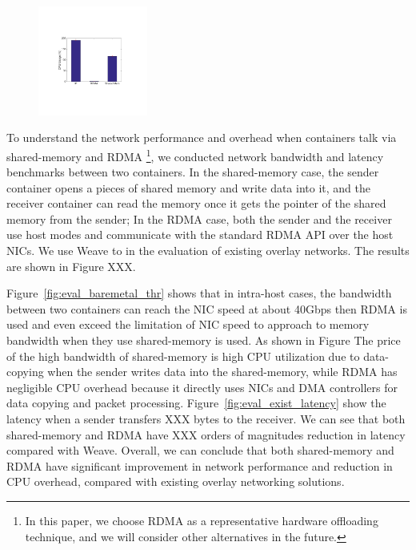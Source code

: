      \begin{figure}[ht]
     \centering 
     \includegraphics[width=0.32\textwidth]{figures/motivation/eval_baremetal_cpu.pdf}      
     \label{fig:eval_baremetal_cpu}
     \caption{} 
     \end{figure}

To understand the network performance and overhead when containers
talk via shared-memory and RDMA \footnote{In this paper, we choose RDMA
as a representative hardware offloading technique, and we will consider other
alternatives in the future.}, we conducted network bandwidth and latency benchmarks between two containers. In the shared-memory case, the sender
container opens a pieces of shared memory and write data into it, and 
the receiver container can read the memory once it gets the pointer of 
the shared memory from the sender; In the RDMA case, both the sender
and the receiver use host modes and communicate with the standard RDMA API
over the host NICs. We use Weave to in the evaluation of existing overlay
networks. The results are shown in Figure XXX.

Figure~\ref{fig:eval_baremetal_thr} shows that in intra-host cases, the bandwidth between two
containers can reach the NIC speed at about 40Gbps then RDMA is used and 
even exceed the limitation of NIC speed to approach to memory bandwidth when
they use shared-memory is used. As shown in Figure The price of the high bandwidth of shared-memory is high CPU utilization due to data-copying when the sender writes data into
the shared-memory, while RDMA has negligible CPU overhead because it directly uses NICs and DMA controllers for data copying and packet processing.
Figure~\ref{fig:eval_exist_latency} show the latency when a sender 
transfers XXX bytes to the receiver. We can see that both shared-memory
and RDMA have XXX orders of magnitudes reduction in latency compared with Weave.
Overall, we can conclude that both shared-memory and RDMA have 
significant improvement in network performance and reduction in CPU overhead,
compared with existing overlay networking solutions.

